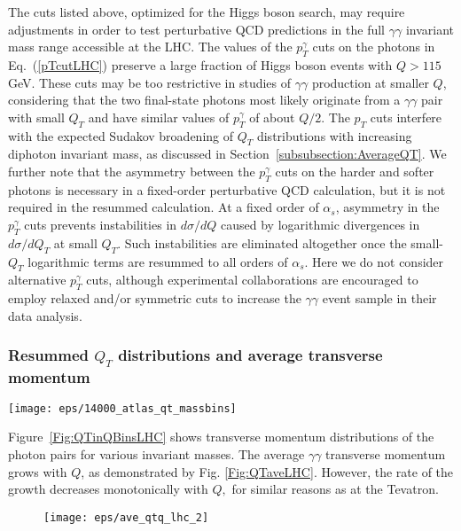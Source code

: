 \documentclass[12pt,english,aps,preprint,prd,letterpaper,fleqn,nofootinbib,showpacs,showkeys,tightenlines,floatfix]{revtex4}
\begin{document}
{The cuts listed above, optimized for the Higgs boson search, may require 
adjustments
in order to test perturbative QCD predictions in the full $\gamma\gamma$
invariant mass range accessible at the LHC. The values of the $p_{T}^{\gamma}$
cuts on the photons in Eq.~(\ref{pTcutLHC}) preserve a large fraction
of Higgs boson events with $Q>115$ GeV. These cuts may be too restrictive
in studies of $\gamma\gamma$ production at smaller $Q$, considering
that the two final-state photons most likely originate from a $\gamma\gamma$
pair with small $Q_{T}$ and have similar values of $p_{T}^{\gamma}$
of about $Q/2$. The $p_T$ cuts interfere with the expected Sudakov
broadening of $Q_T$ distributions with increasing diphoton invariant mass, as
discussed in Section~\ref{subsubsection:AverageQT}. We further note that the asymmetry between the $p_{T}^{\gamma}$
cuts on the harder and softer photons is necessary in a fixed-order
perturbative QCD calculation, but it is not required in the resummed
calculation. At a fixed order of $\alpha_{s}$, asymmetry in the $p_{T}^{\gamma}$
cuts prevents instabilities in $d\sigma/dQ$ caused by logarithmic
divergences in $d\sigma/dQ_{T}$ at small $Q_{T}$. Such instabilities
are eliminated altogether once the small-$Q_{T}$ logarithmic terms
are resummed to all orders of $\alpha_{s}$. Here we do not consider
alternative $p_{T}^{\gamma}$ cuts, although experimental collaborations
are encouraged to employ relaxed and/or symmetric cuts to increase the $\gamma\gamma$
event sample in their data analysis.


\subsubsection{Resummed $Q_{T}$ distributions and average transverse momentum}

\begin{figure*}
\texttt{[image: eps/14000\_atlas\_qt\_massbins]}


\caption{Resummed transverse momentum distributions of photon pairs in various
invariant mass bins at the LHC. The cuts listed in Eqs.~(\ref{pTcutLHC})~and~(\ref{ycutLHC})
are imposed.The $Q_T$ distribution for $70 < Q < 115$ GeV with an additional 
constraint $Q_T < Q$ is shown as a dotted line. \label{Fig:QTinQBinsLHC}}
\end{figure*}


Figure~\ref{Fig:QTinQBinsLHC} shows transverse momentum distributions
of the photon pairs for various invariant masses. The average $\gamma\gamma$
transverse momentum grows with $Q$, as demonstrated by
Fig. \ref{Fig:QTaveLHC}. However, the rate of the growth decreases
monotonically with $Q,$ for similar reasons as at the Tevatron. 
\begin{figure}
\texttt{[image: eps/ave\_qtq\_lhc\_2]}



\end{figure}}
\end{document}
